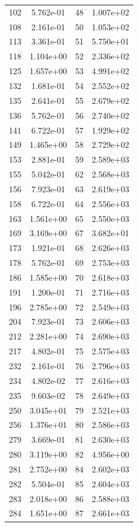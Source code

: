 \documentclass[12pt]{article}
\begin{document}
\begin{longtable}{@{}cccc@{}}
102 & 5.762e-01 & 48 & 1.007e+02 \\
108 & 2.161e-01 & 50 & 1.053e+02 \\
113 & 3.361e-01 & 51 & 5.750e+01 \\
118 & 1.104e+00 & 52 & 2.336e+02 \\
125 & 1.657e+00 & 53 & 4.991e+02 \\
132 & 1.681e-01 & 54 & 2.552e+02 \\
135 & 2.641e-01 & 55 & 2.679e+02 \\
136 & 5.762e-01 & 56 & 2.740e+02 \\
141 & 6.722e-01 & 57 & 1.929e+02 \\
149 & 1.465e+00 & 58 & 2.729e+02 \\
153 & 2.881e-01 & 59 & 2.589e+03 \\
155 & 5.042e-01 & 62 & 2.568e+03 \\
156 & 7.923e-01 & 63 & 2.619e+03 \\
158 & 6.722e-01 & 64 & 2.556e+03 \\
163 & 1.561e+00 & 65 & 2.550e+03 \\
169 & 3.169e+00 & 67 & 3.682e+01 \\
173 & 1.921e-01 & 68 & 2.626e+03 \\
178 & 5.762e-01 & 69 & 2.753e+03 \\
186 & 1.585e+00 & 70 & 2.618e+03 \\
191 & 1.200e-01 & 71 & 2.716e+03 \\
196 & 2.785e+00 & 72 & 2.549e+03 \\
204 & 7.923e-01 & 73 & 2.606e+03 \\
212 & 2.281e+00 & 74 & 2.690e+03 \\
217 & 4.802e-01 & 75 & 2.575e+03 \\
232 & 2.161e-01 & 76 & 2.796e+03 \\
234 & 4.802e-02 & 77 & 2.616e+03 \\
235 & 9.603e-02 & 78 & 2.649e+03 \\
250 & 3.045e+01 & 79 & 2.521e+03 \\
256 & 1.376e+01 & 80 & 2.586e+03 \\
279 & 3.669e-01 & 81 & 2.630e+03 \\
280 & 3.119e+00 & 82 & 4.956e+00 \\
281 & 2.752e+00 & 84 & 2.602e+03 \\
282 & 5.504e-01 & 85 & 2.604e+03 \\
283 & 2.018e+00 & 86 & 2.588e+03 \\
284 & 1.651e+00 & 87 & 2.661e+03 \\

\end{longtable}
\end{document}
